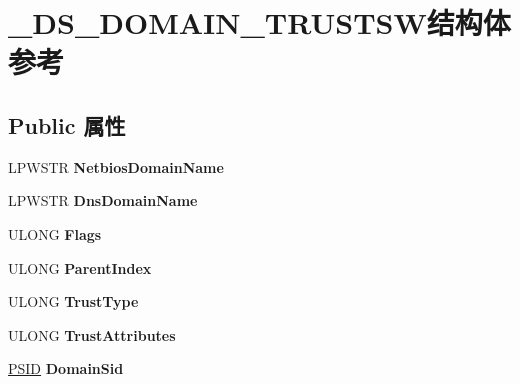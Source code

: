 \hypertarget{struct___d_s___d_o_m_a_i_n___t_r_u_s_t_s_w}{}\section{\+\_\+\+D\+S\+\_\+\+D\+O\+M\+A\+I\+N\+\_\+\+T\+R\+U\+S\+T\+S\+W结构体 参考}
\label{struct___d_s___d_o_m_a_i_n___t_r_u_s_t_s_w}
\subsection*{Public 属性}
\begin{DoxyCompactItemize}
\item 
\mbox{\label{struct___d_s___d_o_m_a_i_n___t_r_u_s_t_s_w_ab79ac3f4f546f0ed3846f9344f7620ed}} 
L\+P\+W\+S\+TR {\bfseries Netbios\+Domain\+Name}
\item 
\mbox{\label{struct___d_s___d_o_m_a_i_n___t_r_u_s_t_s_w_a806a759e6c44c772d51a877fefce3e7b}} 
L\+P\+W\+S\+TR {\bfseries Dns\+Domain\+Name}
\item 
\mbox{\label{struct___d_s___d_o_m_a_i_n___t_r_u_s_t_s_w_a34d7eb21c9bdaaaab39dd50a24c84279}} 
U\+L\+O\+NG {\bfseries Flags}
\item 
\mbox{\label{struct___d_s___d_o_m_a_i_n___t_r_u_s_t_s_w_a5137fdd7cdd4ab694efe94527b0e8dd9}} 
U\+L\+O\+NG {\bfseries Parent\+Index}
\item 
\mbox{\label{struct___d_s___d_o_m_a_i_n___t_r_u_s_t_s_w_add6008b4c2fd33a1b0ffe16ddba2d7b1}} 
U\+L\+O\+NG {\bfseries Trust\+Type}
\item 
\mbox{\label{struct___d_s___d_o_m_a_i_n___t_r_u_s_t_s_w_ac8b6ff2220033ca0726dd84391dd1bd8}} 
U\+L\+O\+NG {\bfseries Trust\+Attributes}
\item 
\mbox{\label{struct___d_s___d_o_m_a_i_n___t_r_u_s_t_s_w_a19abb6ded4dbed61c20a2cbd2bf07a43}} 
\hyperlink{struct___s_i_d}{P\+S\+ID} {\bfseries Domain\+Sid}

\end{DoxyCompactItemize}
